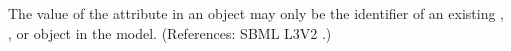 The value of the attribute  in an \EventAssignment object
may only be the identifier of an existing \Compartment, \Species,
\Parameter or \SpeciesReference object in the model.  (References: SBML
L3V2 .)
